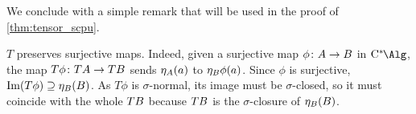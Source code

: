 We conclude with a simple remark that will be used in the proof of \cref{thm:tensor_scpu}.
\begin{remark}\label{rem:T_surjective}
	$T$ preserves surjective maps.
	Indeed, given a surjective map $\phi \colon {A} \to {B}$ in $\Calg$, the map $T\phi \colon T{A} \to T{B}$ sends $\eta_{{A}}(a) $ to $\eta_{{B}}\phi(a)$. 
	Since $\phi$ is surjective, $\operatorname{Im} (T\phi)\supseteq \eta_{{B}}({B})$. 
	As $T\phi$ is $\sigma$-normal, its image must be $\sigma$-closed, so it must coincide with the whole $T{B}$ because $T{B}$ is the $\sigma$-closure of $\eta_{{B}}({B})$.
\end{remark}

